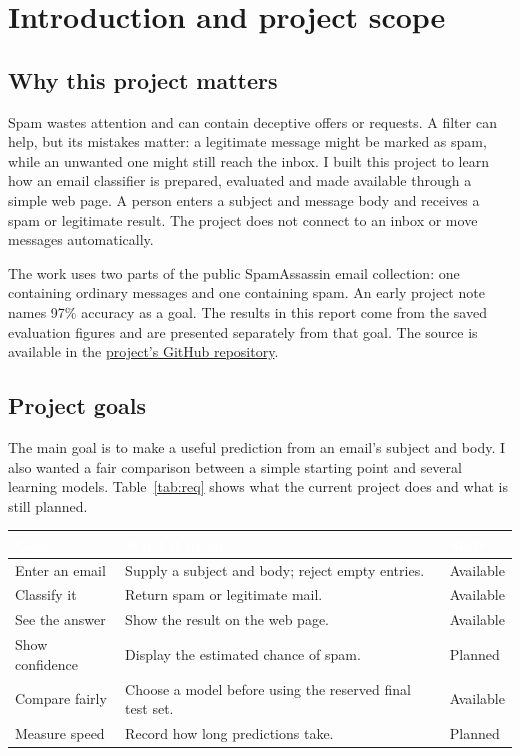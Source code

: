 \chapter{Introduction and project scope}
\section{Why this project matters}
Spam wastes attention and can contain deceptive offers or requests. A filter can help, but its mistakes matter: a legitimate message might be marked as spam, while an unwanted one might still reach the inbox. I built this project to learn how an email classifier is prepared, evaluated and made available through a simple web page. A person enters a subject and message body and receives a spam or legitimate result. The project does not connect to an inbox or move messages automatically.

The work uses two parts of the public SpamAssassin email collection: one containing ordinary messages and one containing spam\cite{corpus}. An early project note names 97\% accuracy as a goal. The results in this report come from the saved evaluation figures and are presented separately from that goal. The source is available in the \href{https://github.com/mohammedaassou/Spam-Email-Classifier}{project's GitHub repository}.

\section{Project goals}
The main goal is to make a useful prediction from an email's subject and body. I also wanted a fair comparison between a simple starting point and several learning models. Table~\ref{tab:req} shows what the current project does and what is still planned.

\begin{center}\small
{}\label{tab:req}
\renewcommand{\arraystretch}{1.08}
\begin{tabular}{>{\raggedright\arraybackslash}p{31mm}>{\raggedright\arraybackslash}p{83mm}>{\raggedright\arraybackslash}p{24mm}}\toprule
\rowcolor{headerblue}\textcolor{white}{\bfseries Goal} & \textcolor{white}{\bfseries What it means} & \textcolor{white}{\bfseries State}\\\midrule
\rowcolor{rowgray}Enter an email & Supply a subject and body; reject empty entries. & Available\\
\rowcolor{white}Classify it & Return spam or legitimate mail. & Available\\
\rowcolor{rowgray}See the answer & Show the result on the web page. & Available\\
\rowcolor{white}Show confidence & Display the estimated chance of spam. & Planned\\
\rowcolor{rowgray}Compare fairly & Choose a model before using the reserved final test set. & Available\\
\rowcolor{white}Measure speed & Record how long predictions take. & Planned\\\bottomrule
\end{tabular}
\end{center}

